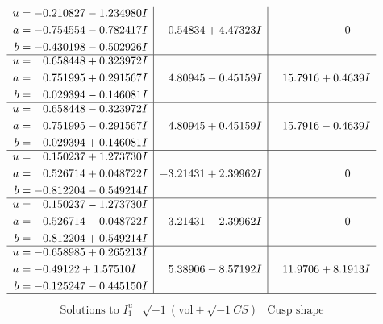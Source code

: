 \documentclass[1p]{elsarticle_modified}
\theoremstyle{definition}
\newcommand{\I}{\sqrt{-1}}
\begin{document}
$$\begin{array}{c|c|c}
\begin{aligned}
u &= -0.210827 - 1.234980 I \\
a &= -0.754554 - 0.782417 I \\
b &= -0.430198 - 0.502926 I\end{aligned}
 & \phantom{-}0.54834 + 4.47323 I & \phantom{-0.000000 } 0 \\ \hline\begin{aligned}
u &= \phantom{-}0.658448 + 0.323972 I \\
a &= \phantom{-}0.751995 + 0.291567 I \\
b &= \phantom{-}0.029394 - 0.146081 I\end{aligned}
 & \phantom{-}4.80945 - 0.45159 I & \phantom{-}15.7916 + 0.4639 I \\ \hline\begin{aligned}
u &= \phantom{-}0.658448 - 0.323972 I \\
a &= \phantom{-}0.751995 - 0.291567 I \\
b &= \phantom{-}0.029394 + 0.146081 I\end{aligned}
 & \phantom{-}4.80945 + 0.45159 I & \phantom{-}15.7916 - 0.4639 I \\ \hline\begin{aligned}
u &= \phantom{-}0.150237 + 1.273730 I \\
a &= \phantom{-}0.526714 + 0.048722 I \\
b &= -0.812204 - 0.549214 I\end{aligned}
 & -3.21431 + 2.39962 I & \phantom{-0.000000 } 0 \\ \hline\begin{aligned}
u &= \phantom{-}0.150237 - 1.273730 I \\
a &= \phantom{-}0.526714 - 0.048722 I \\
b &= -0.812204 + 0.549214 I\end{aligned}
 & -3.21431 - 2.39962 I & \phantom{-0.000000 } 0 \\ \hline\begin{aligned}
u &= -0.658985 + 0.265213 I \\
a &= -0.49122 + 1.57510 I \\
b &= -0.125247 - 0.445150 I\end{aligned}
 & \phantom{-}5.38906 - 8.57192 I & \phantom{-}11.9706 + 8.1913 I\\
 \hline 
 \end{array}$$\newpage$$\begin{array}{c|c|c}  
\text{Solutions to }I^u_{1}& \I (\text{vol} + \sqrt{-1}CS) & \text{Cusp shape}\\

\end{array}$$
\end{document}
